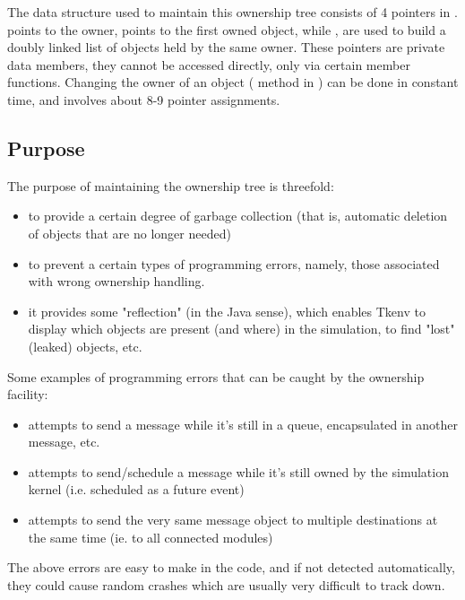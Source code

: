 The data structure used to maintain this ownership tree consists of
4 pointers in .  points to the owner,
 points to the first owned object, while
,  are used to build a doubly linked list
of objects held by the same owner. These pointers are private data
members, they cannot be accessed directly, only via certain
member functions. Changing the owner of an object
( method in )
can be done in constant time, and involves about 8-9 pointer
assignments.


\subsection{Purpose}

The purpose of maintaining the ownership tree is threefold:

\begin{itemize}
    \item{to provide a certain degree of garbage collection (that is,
    automatic deletion of objects that are no longer needed)}

    \item{to prevent a certain types of programming errors, namely,
    those associated with wrong ownership handling.}

    \item{it provides some "reflection" (in the Java sense), which
    enables Tkenv to display which objects are present (and where)
    in the simulation, to find "lost" (leaked) objects, etc.}
\end{itemize}

Some examples of programming errors that can be caught
by the ownership facility:

\begin{itemize}
    \item{attempts to send a message while it's still in a queue,
    encapsulated in another message, etc.}

    \item{attempts to send/schedule a message while it's still owned
    by the simulation kernel (i.e. scheduled as a future event)}

    \item{attempts to send the very same message object to multiple
    destinations at the same time (ie. to all connected modules)}
\end{itemize}

The above errors are easy to make in the code, and if not
detected automatically, they could cause random crashes
which are usually very difficult to track down.

